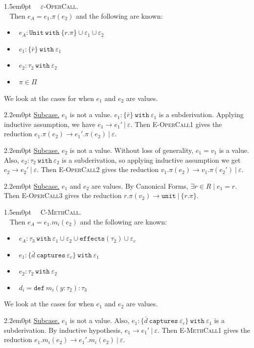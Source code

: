 \documentclass{llncs}
\newcommand{\keywadj}[1]{\mathtt{#1}}
\newcommand{\keyw}[1]{\keywadj{#1}~}
\newcommand{\proofcase}[2]{
	\begin{adjustwidth}{1.5em}{0pt}
		\fbox{Case.}~~#1. \\ ~#2
	\end{adjustwidth}
}
\newcommand{\subcase}[1] {
	\begin{adjustwidth}{2.2em}{0pt}
		\underline{Subcase.} #1
	\end{adjustwidth}
}
\begin{document}
{{	}
	
	\proofcase{\textsc{$\varepsilon$-OperCall}} {
Then $e_A = e_1.\pi(e_2)$ and the following are known:
\begin{itemize}
	\item~$e_A : \keyw{Unit~with} \{ r.\pi \} \cup \varepsilon_1 \cup \varepsilon_2$
	\item~$e_1 : \{ \bar r \}~\keyw{with} \varepsilon_1$
	\item~$e_2 : \tau_2~\keyw{with} \varepsilon_2$
	\item~$\pi \in \Pi$
\end{itemize}
We look at the cases for when $e_1$ and $e_2$ are values.
	
		\subcase { $e_1$ is not a value. $e_1 : \{ \bar r \}~\keyw{with} \varepsilon_1$ is a subderivation. Applying inductive assumption, we have $e_1 \longrightarrow e_1'~|~\varepsilon$. Then \textsc{E-OperCall1} gives the reduction $e_1.\pi(e_2) \longrightarrow e_1'.\pi(e_2)~|~\varepsilon$.
		}
		
		\subcase { $e_2$ is not a value. Without loss of generality, $e_1 = v_1$ is a value. Also, $e_2 : \tau_2~\keyw{with} \varepsilon_2$ is a subderivation, so applying inductive assumption we get $e_2 \longrightarrow e_2'~|~\varepsilon$. Then \textsc{E-OperCall2} gives the reduction $v_1.\pi(e_2) \longrightarrow v_1.\pi(e_2')~|~\varepsilon$. }
		
		\subcase { $e_1$ and $e_2$ are values. By Canonical Forms, $\exists r \in R \mid e_1 = r$. Then \textsc{E-OperCall3} gives the reduction $r.\pi(v_2) \longrightarrow \keywadj{unit}~|~\{ r.\pi \}$.\\}
		
	}
	
	\proofcase{\textsc{C-MethCall}} {
Then $e_A = e_1.m_i(e_2)$ and the following are known:

\begin{itemize}
	\item ~$e_A : \tau_3~\keyw{with} \varepsilon_1 \cup \varepsilon_2 \cup \keywadj{effects}(\tau_2) \cup \varepsilon_c$
	\item ~$e_1 : \{ \bar d~\keyw{captures} \varepsilon_c \}~\keywadj{with}~\varepsilon_1$
	\item ~$e_2 : \tau_2~\keyw{with} \varepsilon_2$
	\item ~$d_i = \keyw{def} m_i(y : \tau_2) : \tau_3$
\end{itemize}
	We look at the cases for when $e_1$ and $e_2$ are values.
	
		\subcase { $e_1$ is not a value. Also, $e_1 : \{ \bar d~\keyw{captures} \varepsilon_c \}~\keywadj{with}~\varepsilon_1$ is a subderivation. By inductive hypothesis, $e_1 \longrightarrow e_1'~|~\varepsilon$. Then \textsc{E-MethCall1} gives the reduction $e_1.m_i(e_2) \longrightarrow e_1'.m_i(e_2)~|~\varepsilon$.}
		
}}
\end{document}
